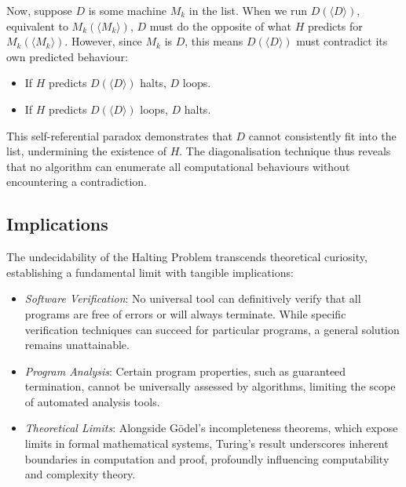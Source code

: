 Now, suppose $D$ is some machine $M_k$ in the list. When we run $D(\langle D \rangle)$, equivalent to $M_k(\langle M_k \rangle)$, $D$ must do the opposite of what $H$ predicts for $M_k(\langle M_k \rangle)$. However, since $M_k$ is $D$, this means $D(\langle D \rangle)$ must contradict its own predicted behaviour:
\begin{itemize}
    \item If $H$ predicts $D(\langle D \rangle)$ halts, $D$ loops.
    \item If $H$ predicts $D(\langle D \rangle)$ loops, $D$ halts.
\end{itemize}
This self-referential paradox demonstrates that $D$ cannot consistently fit into the list, undermining the existence of $H$. The diagonalisation technique thus reveals that no algorithm can enumerate all computational behaviours without encountering a contradiction.


\subsection{Implications}
The undecidability of the Halting Problem transcends theoretical curiosity, establishing a fundamental limit with tangible implications:
\begin{itemize}
    \item \textit{Software Verification}: No universal tool can definitively verify that all programs are free of errors or will always terminate. While specific verification techniques can succeed for particular programs, a general solution remains unattainable.
    \item \textit{Program Analysis}: Certain program properties, such as guaranteed termination, cannot be universally assessed by algorithms, limiting the scope of automated analysis tools.
    \item \textit{Theoretical Limits}: Alongside Gödel's incompleteness theorems, which expose limits in formal mathematical systems, Turing's result underscores inherent boundaries in computation and proof, profoundly influencing computability and complexity theory.
\end{itemize}


